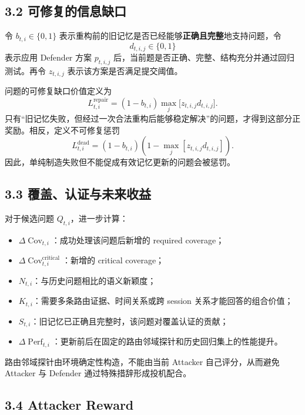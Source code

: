 \documentclass[a4paper,11pt]{article}
\begin{document}
\subsection*{3.2 可修复的信息缺口}

令 $b_{t,i}\in\{0,1\}$ 表示重构前的旧记忆是否已经能够\textbf{正确且完整}地支持问题，令
\[
    d_{t,i,j}\in\{0,1\}
\]
表示应用 Defender 方案 $p_{t,i,j}$ 后，当前题是否正确、完整、结构充分并通过回归测试。再令 $z_{t,i,j}$ 表示该方案是否满足提交阈值。

问题的可修复缺口价值定义为
\[
    L_{t,i}^{\mathrm{repair}}
    =(1-b_{t,i})
    \max_j\bigl[z_{t,i,j}d_{t,i,j}\bigr].
\]
只有“旧记忆失败，但经过一次合法重构后能够稳定解决”的问题，才得到这部分正奖励。相反，定义不可修复惩罚
\[
    L_{t,i}^{\mathrm{dead}}
    =(1-b_{t,i})
    \left(1-\max_j[z_{t,i,j}d_{t,i,j}]\right).
\]
因此，单纯制造失败但不能促成有效记忆更新的问题会被惩罚。

\subsection*{3.3 覆盖、认证与未来收益}

对于候选问题 $Q_{t,i}$，进一步计算：

\begin{itemize}
    \item $\Delta\operatorname{Cov}_{t,i}$：成功处理该问题后新增的 required coverage；
    \item $\Delta\operatorname{Cov}^{\mathrm{critical}}_{t,i}$：新增的 critical coverage；
    \item $N_{t,i}$：与历史问题相比的语义新颖度；
    \item $K_{t,i}$：需要多条路由证据、时间关系或跨 session 关系才能回答的组合价值；
    \item $S_{t,i}$：旧记忆已正确且完整时，该问题对覆盖认证的贡献；
    \item $\Delta\operatorname{Perf}_{t,i}$：更新前后在固定的路由邻域探针和历史回归集上的性能提升。
\end{itemize}

路由邻域探针由环境确定性构造，不能由当前 Attacker 自己评分，从而避免 Attacker 与 Defender 通过特殊措辞形成投机配合。

\subsection*{3.4 Attacker Reward}
\end{document}
